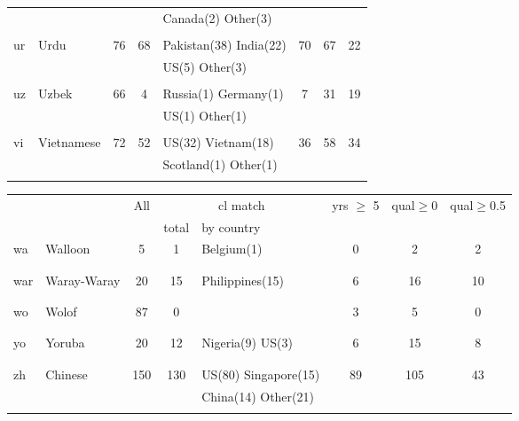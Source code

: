 \begin{figure}[h]
\begin{tabular}{llcclccc}
&&&&Canada(2) Other(3) &&&\\
&&&&&&&\\
ur&Urdu&76&68&Pakistan(38) India(22) &70&67&22\\
&&&&US(5) Other(3) &&&\\
&&&&&&&\\
uz&Uzbek&66&4&Russia(1) Germany(1) &7&31&19\\
&&&&US(1) Other(1) &&&\\
&&&&&&&\\
vi&Vietnamese&72&52&US(32) Vietnam(18) &36&58&34\\
&&&&Scotland(1) Other(1) &&&\\
&&&&&&&\\
\end{tabular}
\end{figure}
\clearpage
\begin{figure}[h]
\centering
\begin{tabular}{llcclccc}
&&All&\multicolumn{2}{c}{cl match}&yrs $\geq$ 5&qual$\geq$0&qual$\geq$0.5\\
&&&total&by country&&\\
\hline\hline
wa&Walloon&5&1&Belgium(1) &0&2&2\\
&&&&&&&\\
&&&&&&&\\
war&Waray-Waray&20&15&Philippines(15) &6&16&10\\
&&&&&&&\\
&&&&&&&\\
wo&Wolof&87&0&&3&5&0\\
&&&&&&&\\
&&&&&&&\\
yo&Yoruba&20&12&Nigeria(9) US(3) &6&15&8\\
&&&&&&&\\
&&&&&&&\\
zh&Chinese&150&130&US(80) Singapore(15) &89&105&43\\
&&&&China(14) Other(21) &&&\\
&&&&&&&\\
\hline\hline
\end{tabular}
\end{figure}
